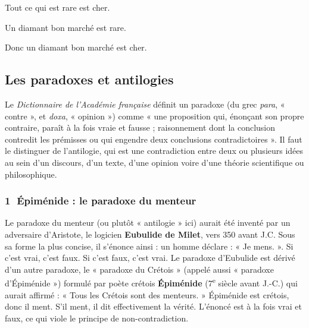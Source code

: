 Tout ce qui est rare est cher.

Un diamant bon marché est rare.

Donc un diamant bon marché est cher.

\subsection{Les paradoxes et antilogies}
Le \textit{Dictionnaire de l’Académie française} définit un paradoxe (du grec \textit{para}, « contre », et \textit{doxa}, « opinion ») comme « une proposition qui, énonçant son propre contraire, paraît à la fois vraie et fausse ; raisonnement dont la conclusion contredit les prémisses ou qui engendre deux conclusions contradictoires ». Il faut le distinguer de l’antilogie, qui est une contradiction entre deux ou plusieurs idées au sein d’un discours, d’un texte, d’une opinion voire d’une théorie scientifique ou philosophique.

\subsubsection*{\textcircled{\scriptsize 1} Épiménide : le paradoxe du menteur}
Le paradoxe du menteur (ou plutôt « antilogie » ici) aurait été inventé par un adversaire d’Aristote, le logicien \textbf{Eubulide de Milet}, vers 350 avant J.C. Sous sa forme la plus concise, il s’énonce ainsi : un homme déclare : « Je mens. ». Si c’est vrai, c’est faux. Si c’est faux, c’est vrai. Le paradoxe d’Eubulide est dérivé d’un autre paradoxe, le « paradoxe du Crétois » (appelé aussi « paradoxe d’Épiménide ») formulé par poète crétois \textbf{Épiménide} (7\textsuperscript{e} siècle avant J.-C.) qui aurait affirmé : « Tous les Crétois sont des menteurs. » Épiménide est crétois, donc il ment. S’il ment, il dit effectivement la vérité. L’énoncé est à la fois vrai et faux, ce qui viole le principe de non-contradiction.

